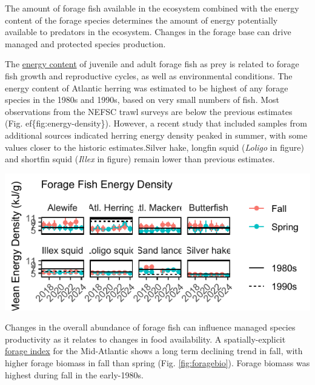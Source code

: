 \documentclass[
  10pt,
]{article}
\let\origfigure\figure
\let\endorigfigure\endfigure
\renewenvironment{figure}[1][2] {
    \expandafter\origfigure\expandafter[H]
} {
    \endorigfigure
}
\begin{document}
The amount of forage fish available in the ecosystem combined with the energy content of the forage species determines the amount of energy potentially available to predators in the ecosystem. Changes in the forage base can drive managed and protected species production.

The \href{https://noaa-edab.github.io/catalog/energy_density.html}{energy content} of juvenile and adult forage fish as prey is related to forage fish growth and reproductive cycles, as well as environmental conditions. The energy content of Atlantic herring was estimated to be highest of any forage species in the 1980s and 1990s, based on very small numbers of fish. Most observations from the NEFSC trawl surveys are below the previous estimates (Fig. ef\{fig:energy-density\}). However, a recent study that included samples from additional sources indicated herring energy density peaked in summer, with some values closer to the historic estimates.Silver hake, longfin squid (\emph{Loligo} in figure) and shortfin squid (\emph{Illex} in figure) remain lower than previous estimates.

\begin{figure}

{\centering \includegraphics{midatlantic_files/figure-latex/energy-density-1} 

}

\caption{Energy density (mean and standard deviation) of eight forage species from NEFSC bottom trawl surveys by season and year, compared with limited data available from the 1980s (solid line) and 1990s (dashed line)}\label{fig:energy-density}
\end{figure}

Changes in the overall abundance of forage fish can influence managed species productivity as it relates to changes in food availability. A spatially-explicit \href{https://noaa-edab.github.io/catalog/forage_index.html}{forage index} for the Mid-Atlantic shows a long term declining trend in fall, with higher forage biomass in fall than spring (Fig. \ref{fig:foragebio}). Forage biomass was highest during fall in the early-1980s.
\end{document}
